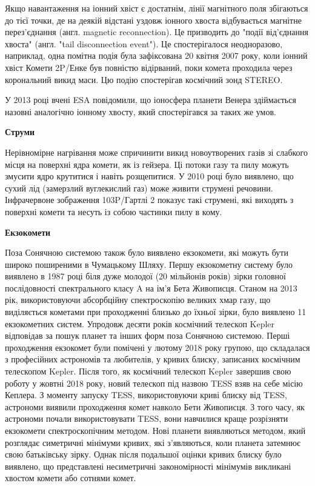 \documentclass[a4paper]{article}
\begin{document}
    Якщо навантаження на іонний хвіст є достатнім, лінії магнітного поля збігаються до тієї точки, де на деякій відстані уздовж іонного хвоста відбувається магнітне перез'єднання (англ. magnetic reconnection). Це призводить до "події від'єднання хвоста" (англ. "tail disconnection event"). Це спостерігалося неодноразово, наприклад, одна помітна подія була зафіксована 20 квітня 2007 року, коли іонний хвіст Комети 2P/Енке був повністю відірваний, поки комета проходила через корональний викид маси. Цю подію спостерігав космічний зонд STEREO.
    
    У 2013 році вчені ESA повідомили, що іоносфера планети Венера здіймається назовні аналогічно іонному хвосту, який спостерігався за таких же умов.
    
    \textbf{Струми}
    
    Нерівномірне нагрівання може спричинити викид новоутворених газів зі слабкого місця на поверхні ядра комети, як із гейзера. Ці потоки газу та пилу можуть змусити ядро крутитися і навіть розщепитися. У 2010 році було виявлено, що сухий лід (замерзлий вуглекислий газ) може живити струмені речовини. Інфрачервоне зображення 103P/Гартлі 2\cite{20} показує такі струмені, які виходять з поверхні комети та несуть із собою частинки пилу в кому.
    
    \textbf{Екзокомети}
    
    Поза Сонячною системою також було виявлено екзокомети, які можуть бути широко поширеними в Чумацькому Шляху. Першу екзокометну систему було виявлено в 1987 році біля дуже молодої (20 мільйонів років) зірки головної послідовності спектрального класу A на ім'я Бета Живописця. Станом на 2013 рік, використовуючи абсорбційну спектроскопію великих хмар газу, що виділяється кометами при проходженні близько до їхньої зірки, було виявлено 11 екзокометних систем. Упродовж десяти років космічний телескоп Kepler відповідав за пошук планет та інших форм поза Сонячною системою. Перші проходження екзокомет були помічені у лютому 2018 року групою, що складалася з професійних астрономів та любителів, у кривих блиску\cite{21}, записаних космічним телескопом Kepler. Після того, як космічний телескоп Kepler завершив свою роботу у жовтні 2018 року, новий телескоп під назвою TESS взяв на себе місію Кеплера. З моменту запуску TESS, використовуючи криві блиску від TESS, астрономи виявили проходження комет навколо Бети Живописця. З того часу, як астрономи почали використовувати TESS, вони навчилися краще розрізняти екзокомети спектроскопічним методом. Нові планети виявляються методом, який розглядає симетричні мінімуми кривих, які з'являються, коли планета затемнює свою батьківську зірку. Однак після подальшої оцінки кривих блиску було виявлено, що представлені несиметричні закономірності мінімумів викликані хвостом комети або сотнями комет.
    
\end{document}
